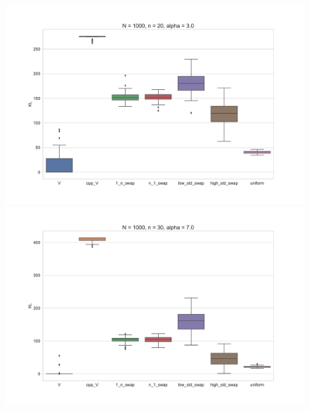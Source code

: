 \documentclass[11pt, oneside]{article}   	%
\begin{document}
\begin{figure}[h!]
\begin{minipage}[t]{.23\textwidth}
	\end{minipage}
	\hfill
	\begin{minipage}[t]{.23\textwidth}
		\centering
		\includegraphics[width=\textwidth]{figures/theorem2_2/N1000n20alpha3.pdf}
		
	\end{minipage} 
	\begin{minipage}[t]{.23\textwidth}
		\centering
		\includegraphics[width=\textwidth]{figures/theorem2_2/N1000n30alpha7.pdf}
		

\end{minipage}
\end{figure}
\end{document}
